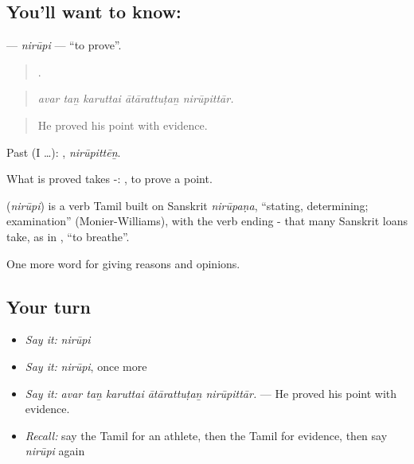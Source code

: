 \subsection*{You'll want to know: }
\textbf{} — \emph{nirūpi} — \textquotedblleft{}to prove\textquotedblright{}.

\begin{quote}
    .
\end{quote}

\begin{quote}
\emph{avar taṉ karuttai ātārattuṭaṉ nirūpittār.}
\end{quote}

\begin{quote}
He proved his point with evidence.
\end{quote}

Past (I …): , \emph{nirūpittēṉ}.

What is proved takes -:  , to prove a point.

\begin{cousinweb}
\textbf{} (\emph{nirūpi}) is a verb Tamil built on Sanskrit \emph{nirūpaṇa}, \textquotedblleft{}stating, determining; examination\textquotedblright{} (Monier-Williams), with the verb ending - that many Sanskrit loans take, as in , \textquotedblleft{}to breathe\textquotedblright{}.
\end{cousinweb}

\begin{grammarlens}[title={What you've built}]
One more word for giving reasons and opinions.
\end{grammarlens}

\subsection*{Your turn}
\begin{itemize}
\raggedright
  \item \emph{Say it:} \emph{nirūpi}
  \item \emph{Say it:} \emph{nirūpi}, once more
  \item \emph{Say it:} \emph{avar taṉ karuttai ātārattuṭaṉ nirūpittār.} — He proved his point with evidence.
  \item \emph{Recall:} say the Tamil for an athlete, then the Tamil for evidence, then say \emph{nirūpi} again
\end{itemize}

